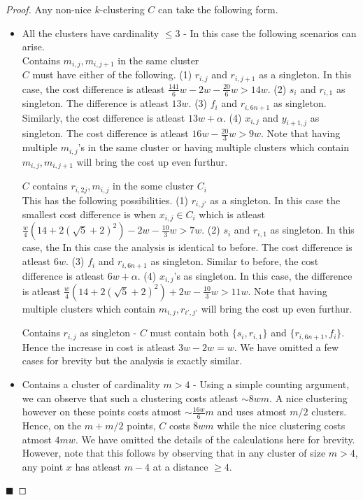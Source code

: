 \documentclass[orivec]{llncs}
\renewcommand{\qed}{\hfill\ensuremath{\blacksquare}}
\begin{document}
\begin{proof}
Any non-nice $k$-clustering $C$ can take the following form. 
\begin{itemize}[nolistsep]
\item All the clusters have cardinality $\le 3$ - In this case the following scenarios can arise.\\
Contains $m_{i, j}, m_{i,j+1}$ in the same cluster\\
$C$ must have either of the following. (1) $r_{i, j}$ and $r_{i,j+1}$ as a singleton. In this case, the cost difference is atleast $ \frac{141}{6}w - 2w -\frac{20}{6}w > 14w$. (2) $s_i$ and $r_{i,1}$ as singleton. The difference is atleast $13w$. (3) $f_i$ and $r_{i,6n+1}$ as singleton. Similarly,  the cost difference is atleast $13w+\alpha$. (4) $x_{i,j}$ and $y_{i+1,j}$ as singleton. The cost difference is atleast $16w-\frac{20}{3}w > 9w$. Note that having multiple $m_{i, j}$'s in the same cluster or having multiple clusters which contain $m_{i, j}, m_{i,j+1}$ will bring the cost up even furthur.

$C$ contains $r_{i, 2j}, m_{i, j}$ in the some cluster $C_i$\\
This has the following possibilities. (1) $r_{i, j'}$ as a singleton. In this case the smallest cost difference is when $x_{i,j} \in C_i$ which is atleast $ \frac{w}{4}(14+2(\sqrt5+2)^2) - 2w -\frac{10}{3}w > 7w$. (2) $s_i$ and $r_{i,1}$ as singleton. In this case, the In this case the analysis is identical to before. The cost difference is atleast $6w$. (3) $f_i$ and $r_{i,6n+1}$ as singleton. Similar to before, the cost difference is atleast $6w+\alpha$. (4) $x_{i,j}$'s as singleton. In this case, the difference is atleast $ \frac{w}{4}(14+2(\sqrt5+2)^2) + 2w -\frac{10}{3}w > 11w$. Note that having multiple clusters which contain $m_{i, j}, r_{i',j'}$ will bring the cost up even furthur.

Contains $r_{i,j}$ as singleton - $C$ must contain both $\{s_i, r_{i,1}\}$ and $\{r_{i,6n+1}, f_i\}$. Hence the increase in cost is atleast $3w - 2w = w$. We have omitted a few cases for brevity but the analysis is exactly similar. 

\item Contains a cluster of cardinality $m > 4$ - Using a simple counting argument, we can observe that such a clustering costs atleast $\sim 8wm$. A nice clustering however on these points costs atmost $\sim \frac{16w}{6}m$ and uses atmost $m/2$ clusters. Hence, on the $m+m/2$ points, $C$ costs $8wm$ while the nice clustering costs atmost $4mw$. We have omitted the details of the calculations here for brevity. However, note that this follows by observing that in any cluster of size $m > 4$, any point $x$ has atleast $m-4$ at a distance $\ge 4$.
\end{itemize}
\qed
\end{proof}
\end{document}
